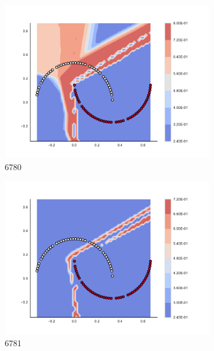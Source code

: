 \begin{figure}[h]
\begin{subfigure}[b]{0.09\textwidth}
    \includegraphics[clip, trim=2.35cm 1.75cm 4.5cm 0cm,width=\textwidth]{img/convergence/6780.pdf}
    \caption{6780}
    \label{fig:convergence_6780}
\end{subfigure}
%
\begin{subfigure}[b]{0.09\textwidth}
    \includegraphics[clip, trim=2.35cm 1.75cm 4.5cm 0cm,width=\textwidth]{img/convergence/6781.pdf}
    \caption{6781}
    \label{fig:convergence_6781}
\end{subfigure}
%
\begin{subfigure}[b]{0.09\textwidth}

\end{subfigure}
\end{figure}
